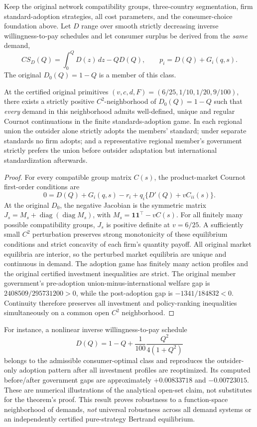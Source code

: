 Keep the original network compatibility groups, three-country
segmentation, firm standard-adoption strategies, all cost parameters,
and the consumer-choice foundation above.  Let \(D\) range over
smooth strictly decreasing inverse willingness-to-pay schedules and
let consumer surplus be derived from the \emph{same} demand,
\[
CS_D(Q)=\int_0^Q D(z)\,dz-QD(Q),\qquad
p_i=D(Q)+G_i(q,s).
\]
The original \(D_0(Q)=1-Q\) is a member of this class.

\begin{proposition}
\label{prop:nonparametric-R15}
At the certified original primitives
\((v,c,d,F)=(6/25,1/10,1/20,9/100)\), there exists a
strictly positive \(C^2\)-neighborhood of \(D_0(Q)=1-Q\)
such that \emph{every} demand in this neighborhood admits
well-defined, unique and regular Cournot continuations in the
finite standards-adoption game.  In each regional union the
outsider alone strictly adopts the members' standard; under
separate standards no firm adopts; and a representative
regional member's government strictly prefers the union
before outsider adaptation but international standardization
afterwards.
\end{proposition}
\begin{proof}
For every compatible group matrix \(C(s)\), the product-market
Cournot first-order conditions are
\[
0=D(Q)+G_i(q,s)-r_i
  +q_i\{D'(Q)+vC_{ii}(s)\}.
\]
At the original \(D_0\), the negative Jacobian is the symmetric
matrix \(J_s=M_s+\operatorname{diag}(\operatorname{diag}M_s)\),
with \(M_s=\mathbf1\mathbf1^\top-vC(s)\).
For all finitely many possible compatibility groups,
\(J_s\) is positive definite at \(v=6/25\).
A sufficiently small \(C^2\) perturbation preserves strong
monotonicity of these equilibrium conditions and strict
concavity of each firm's quantity payoff.  All original market
equilibria are interior, so the perturbed market equilibria are
unique and continuous in demand.  The adoption game has
finitely many action profiles and the original certified
investment inequalities are strict.  The original member
government's pre-adoption union-minus-international welfare
gap is \(2408509/295731200>0\), while the post-adoption gap is
\(-1341/184832<0\).  Continuity therefore preserves all
investment and policy-ranking inequalities simultaneously
on a common open \(C^2\) neighborhood.
\end{proof}
For instance, a nonlinear inverse willingness-to-pay schedule
\[
D(Q)=1-Q+\frac1{100}\frac{Q^2}{4(1+Q^2)}
\]
belongs to the admissible consumer-optimal class and reproduces
the outsider-only adoption pattern after all investment profiles
are reoptimized.  Its computed before/after government gaps
are approximately \(+0.00833718\) and \(-0.00723015\).
These are numerical illustrations of the analytical open-set
claim, not substitutes for the theorem's proof.  This result
proves robustness to a function-space neighborhood of demands,
\emph{not} universal robustness across all demand systems or
an independently certified pure-strategy Bertrand equilibrium.


